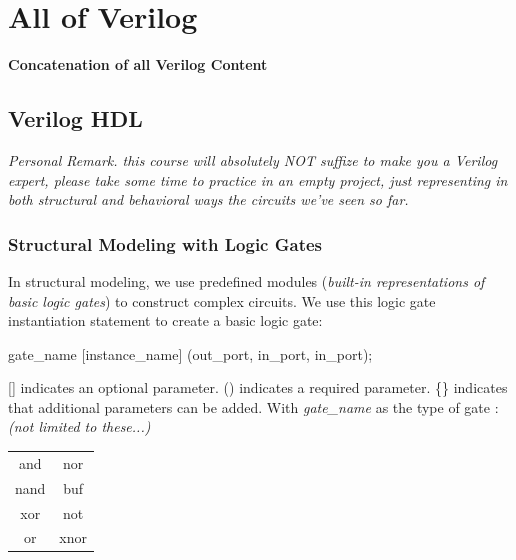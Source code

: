 \documentclass[12pt,openany]{book}
\begin{document}
\chapter{All of Verilog}
\label{Verilog}\begin{center}\vspace*{1cm}\begin{center}\textbf{Concatenation of all Verilog Content}\end{center} \end{center}\newpage

\section{Verilog HDL}
					\textit{Personal Remark. this course will absolutely NOT suffize to make you a Verilog expert, please take some time to practice in an empty project, just representing in both structural and behavioral ways the circuits we've seen so far. }
			      	\subsection{Structural Modeling with Logic Gates}
			      	In structural modeling, we use predefined modules (\textit{built-in representations of basic logic gates}) to construct complex circuits.\newline
			      	\vspace{5px}
			      	We use this logic gate instantiation statement to create a basic logic gate:
\begin{vhdl}
gate_name [instance_name] (out_port, in_port{, in_port});
\end{vhdl}
			      	[] indicates an optional parameter.\newline
			      	()  indicates a required parameter. \newline
			      	\{\} indicates that additional parameters can be added. \newline
			      	\vspace*{10px}
			      	With \textit{gate\_name} as the type of gate :\newline
			      	\textit{(not limited to these...)}
			      	\begin{center}
			      		\begin{tabular}{|c|c|}
			      			\hline
			      			and  & nor  \\
			      			nand & buf  \\
			      			xor  & not  \\
			      			or   & xnor \\
			      			\hline
			      		\end{tabular}
			      	\end{center}
			      	
\end{document}
